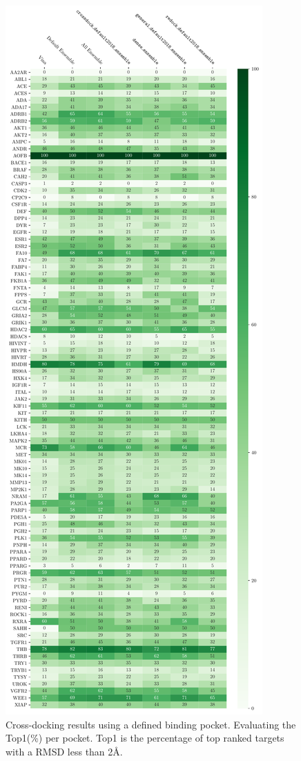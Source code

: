 \documentclass[journal=jcisd8,manuscript=article]{achemso}
\begin{document}
\begin{figure}
    \centering
    \includegraphics[height=0.9\textheight]{figures/crossdocking/top1_per_pocket.pdf}
    \caption{Cross-docking results using a defined binding pocket. Evaluating the Top1(\%) per pocket. Top1 is the percentage of top ranked targets with a RMSD less than 2{\AA}.}
    \label{fig:Top1_PerPock}
\end{figure}
\end{document}
